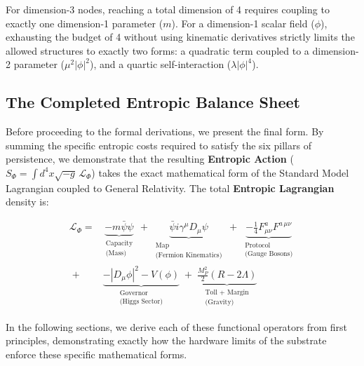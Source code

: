 \begin{itemize}
    For dimension-3 nodes, reaching a total dimension of 4 requires coupling to exactly one dimension-1 parameter ($m$). For a dimension-1 scalar field ($\phi$), exhausting the budget of 4 without using kinematic derivatives strictly limits the allowed structures to exactly two forms: a quadratic term coupled to a dimension-2 parameter ($\mu^2|\phi|^2$), and a quartic self-interaction ($\lambda|\phi|^4$).
\end{itemize}

\subsection{The Completed Entropic Balance Sheet}
\label{subsec:the_target}

Before proceeding to the formal derivations, we present the final form. By summing the specific entropic costs required to satisfy the six pillars of persistence, we demonstrate that the resulting \textbf{Entropic Action} ($S_\Phi = \int d^4x \sqrt{-g} \, \mathcal{L}_\Phi$) takes the exact mathematical form of the Standard Model Lagrangian coupled to General Relativity. The total \textbf{Entropic Lagrangian} density is:

\begin{equation}
\begin{aligned}
\mathcal{L}_\Phi =&  \underbrace{-m\bar{\psi}\psi}_{\substack{\text{Capacity} \\ \text{(Mass)}}}
\;+\; \underbrace{\bar{\psi} i\gamma^\mu D_\mu \psi}_{\substack{\text{Map} \\ \text{(Fermion Kinematics)}}} 
\;+\; \underbrace{-\frac{1}{4}F^a_{\mu\nu}F^{a\,\mu\nu}}_{\substack{\text{Protocol} \\ \text{(Gauge Bosons)}}} \\
\;+\; & \underbrace{- |D_\mu\phi|^2 - V(\phi)}_{\substack{\text{Governor} \\ \text{(Higgs Sector)}}} 
\;+\; \underbrace{\frac{M_P^2}{2}(R - 2\Lambda)}_{\substack{\text{Toll + Margin} \\ \text{(Gravity)}}}
\label{eq:entropic_lagrangian}
\end{aligned}
\end{equation}

In the following sections, we derive each of these functional operators from first principles, demonstrating exactly how the hardware limits of the substrate enforce these specific mathematical forms.
